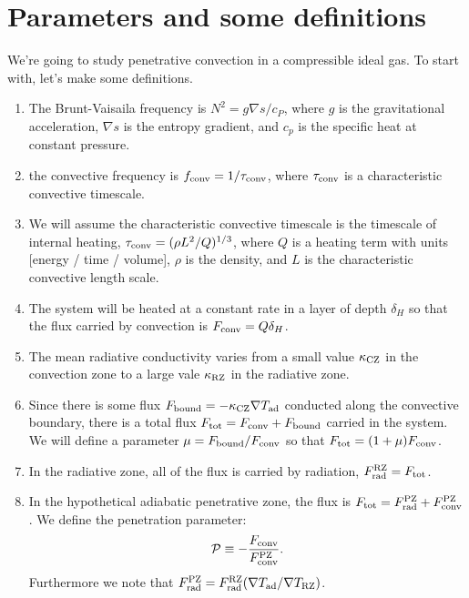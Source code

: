 \documentclass[onecolumn, amsmath, amsfonts, amssymb]{aastex62}
\newcommand{\grad}{\ensuremath{\nabla}}
\begin{document}
\section{Parameters and some definitions}
We're going to study penetrative convection in a compressible ideal gas.
To start with, let's make some definitions.
\begin{enumerate}
    \item The Brunt-Vaisaila frequency is $N^2 = g \grad s / c_P$, where $g$ is the gravitational acceleration, $\grad s$ is the entropy gradient, and $c_p$ is the specific heat at constant pressure.
    \item the convective frequency is $f_{\rm{conv}} = 1/\tau_{\rm{conv}}$, where $\tau_{\rm{conv}}$ is a characteristic convective timescale.
    \item We will assume the characteristic convective timescale is the timescale of internal heating, $\tau_{\rm{conv}} = (\rho L^2 / Q)^{1/3}$, where $Q$ is a heating term with units [energy / time / volume], $\rho$ is the density, and $L$ is the characteristic convective length scale.
    \item The system will be heated at a constant rate in a layer of depth $\delta_H$ so that the flux carried by convection is $F_{\rm{conv}} = Q \delta_H$.
    \item The mean radiative conductivity varies from a small value $\kappa_{\rm{CZ}}$ in the convection zone to a large vale $\kappa_{\rm{RZ}}$ in the radiative zone.
    \item Since there is some flux $F_{\rm{bound}} = - \kappa_{\rm{CZ}}\grad T_{\rm{ad}}$ conducted along the convective boundary, there is a total flux $F_{\rm{tot}} = F_{\rm{conv}} + F_{\rm{bound}}$ carried in the system.
        We will define a parameter $\mu = F_{\rm{bound}}/F_{\rm{conv}}$ so that $F_{\rm{tot}} = (1 + \mu) F_{\rm{conv}}$.
    \item In the radiative zone, all of the flux is carried by radiation, $F_{\rm{rad}}^{\rm{RZ}} = F_{\rm{tot}}$.
    \item In the hypothetical adiabatic penetrative zone, the flux is $F_{\rm{tot}} = F_{\rm{rad}}^{\rm{PZ}} + F_{\rm{conv}}^{\rm{PZ}}$.
        We define the penetration parameter:
        \begin{equation}
            \mathcal{P} \equiv -\frac{F_{\rm{conv}}}{F_{\rm{conv}}^{\rm{PZ}}}.
        \end{equation}
        Furthermore we note that $F_{\rm{rad}}^{\rm{PZ}} = F_{\rm{rad}}^{\rm{RZ}}(\grad T_{\rm{ad}} / \grad T_{\rm{RZ}})$.

\end{enumerate}
\end{document}
